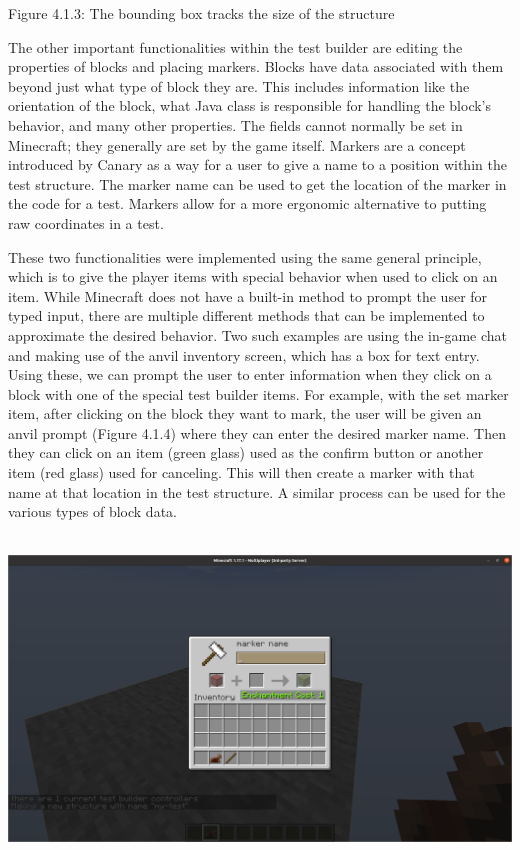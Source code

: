 \documentclass{article}
\begin{document}
\begin{onehalfspacing}
Figure 4.1.3: The bounding box tracks the size of the structure

The other important functionalities within the test builder are editing
the properties of blocks and placing markers. Blocks have data
associated with them beyond just what type of block they are. This
includes information like the orientation of the block, what Java class
is responsible for handling the block's behavior, and many other
properties. The fields cannot normally be set in Minecraft; they
generally are set by the game itself. Markers are a concept introduced
by Canary as a way for a user to give a name to a position within the
test structure. The marker name can be used to get the location of the
marker in the code for a test. Markers allow for a more ergonomic
alternative to putting raw coordinates in a test.

These two functionalities were implemented using the same general
principle, which is to give the player items with special behavior when
used to click on an item. While Minecraft does not have a built-in
method to prompt the user for typed input, there are multiple different
methods that can be implemented to approximate the desired behavior. Two
such examples are using the in-game chat and making use of the anvil
inventory screen, which has a box for text entry. Using these, we can
prompt the user to enter information when they click on a block with one
of the special test builder items. For example, with the set marker
item, after clicking on the block they want to mark, the user will be
given an anvil prompt (Figure 4.1.4) where they can enter the desired
marker name. Then they can click on an item (green glass) used as the
confirm button or another item (red glass) used for canceling. This will
then create a marker with that name at that location in the test
structure. A similar process can be used for the various types of block
data.

\includegraphics[width=6.16146in,height=3.3967in]{media/media/image8.png}


\end{onehalfspacing}
\end{document}
